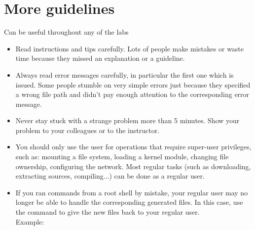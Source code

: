 \clearpage
\section{More guidelines}

Can be useful throughout any of the labs

\begin{itemize}

\item Read instructions and tips carefully. Lots of people make
  mistakes or waste time because they missed an explanation or a
  guideline.

\item Always read error messages carefully, in particular the first
  one which is issued. Some people stumble on very simple errors just
  because they specified a wrong file path and didn't pay enough
  attention to the corresponding error message.

\item Never stay stuck with a strange problem more than 5
  minutes. Show your problem to your colleagues or to the instructor.

\item You should only use the  user for operations that require
  super-user privileges, such as: mounting a file system, loading a
  kernel module, changing file ownership, configuring the
  network. Most regular tasks (such as downloading, extracting
  sources, compiling...) can be done as a regular user.

\item If you ran commands from a root shell by mistake, your regular
  user may no longer be able to handle the corresponding generated
  files. In this case, use the  command to give the new
  files back to your regular user.\\
  Example: 

\end{itemize}

